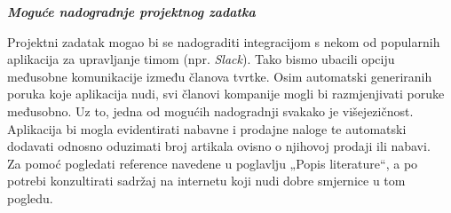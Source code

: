 		\large\textbf{\textit{Moguće nadogradnje projektnog zadatka}}\normalsize
		
		Projektni zadatak mogao bi se nadograditi integracijom s nekom od popularnih aplikacija za upravljanje timom (npr. \emph{Slack}). Tako bismo ubacili opciju međusobne komunikacije između članova tvrtke. Osim automatski generiranih poruka koje aplikacija nudi, svi članovi kompanije mogli bi razmjenjivati poruke međusobno. Uz to, jedna od mogućih nadogradnji svakako je višejezičnost. Aplikacija bi mogla evidentirati nabavne i prodajne naloge te automatski dodavati odnosno oduzimati broj artikala ovisno o njihovoj prodaji ili nabavi.\\
		
		
		Za pomoć pogledati reference navedene u poglavlju „Popis literature“, a po potrebi konzultirati sadržaj na internetu koji nudi dobre smjernice u tom pogledu.
		\eject
		
